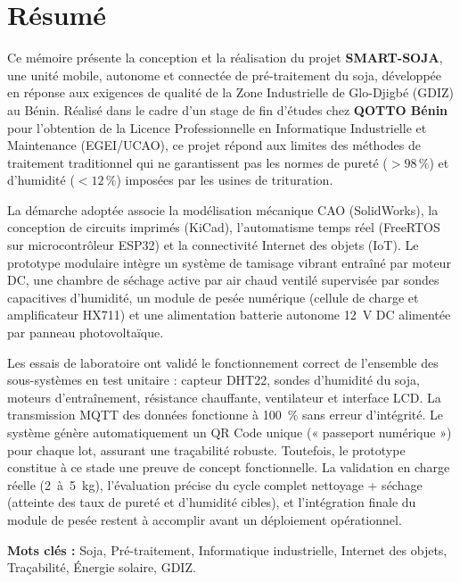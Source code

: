 \chapter*{Résumé}

Ce mémoire présente la conception et la réalisation du projet \textbf{SMART-SOJA}, une unité mobile, autonome et connectée de pré-traitement du soja, développée en réponse aux exigences de qualité de la Zone Industrielle de Glo-Djigbé (GDIZ) au Bénin. Réalisé dans le cadre d'un stage de fin d'études chez \textbf{QOTTO Bénin} pour l'obtention de la Licence Professionnelle en Informatique Industrielle et Maintenance (EGEI/UCAO), ce projet répond aux limites des méthodes de traitement traditionnel qui ne garantissent pas les normes de pureté ($> 98\,\%$) et d'humidité ($< 12\,\%$) imposées par les usines de trituration.

La démarche adoptée associe la modélisation mécanique CAO (SolidWorks), la conception de circuits imprimés (KiCad), l'automatisme temps réel (FreeRTOS sur microcontrôleur ESP32) et la connectivité Internet des objets (IoT). Le prototype modulaire intègre un système de tamisage vibrant entraîné par moteur DC, une chambre de séchage active par air chaud ventilé supervisée par sondes capacitives d'humidité, un module de pesée numérique (cellule de charge et amplificateur HX711) et une alimentation batterie autonome 12~V DC alimentée par panneau photovoltaïque.

Les essais de laboratoire ont validé le fonctionnement correct de l'ensemble des sous-systèmes en test unitaire : capteur DHT22, sondes d'humidité du soja, moteurs d'entraînement, résistance chauffante, ventilateur et interface LCD. La transmission MQTT des données fonctionne à 100~\% sans erreur d'intégrité. Le système génère automatiquement un QR Code unique (« passeport numérique ») pour chaque lot, assurant une traçabilité robuste. Toutefois, le prototype constitue à ce stade une preuve de concept fonctionnelle. La validation en charge réelle (2~à~5~kg), l'évaluation précise du cycle complet nettoyage + séchage (atteinte des taux de pureté et d'humidité cibles), et l'intégration finale du module de pesée restent à accomplir avant un déploiement opérationnel.

\textbf{Mots clés :} Soja, Pré-traitement, Informatique industrielle, Internet des objets, Traçabilité, Énergie solaire, GDIZ.
